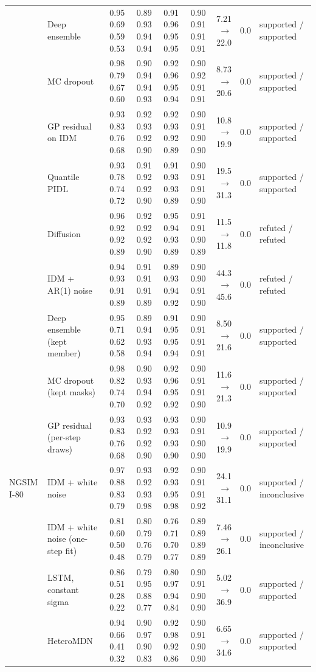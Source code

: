 \begin{longtable}{llrrrrrrl}
 & Deep ensemble & 0.95 0.69 0.59 0.53 & 0.89 0.93 0.94 0.94 & 0.91 0.96 0.95 0.95 & 0.90 0.91 0.91 0.91 & 7.21 $\rightarrow$ 22.0 & 0.0 & supported / supported \\
 & MC dropout & 0.98 0.79 0.67 0.60 & 0.90 0.94 0.94 0.93 & 0.92 0.96 0.95 0.94 & 0.90 0.92 0.91 0.91 & 8.73 $\rightarrow$ 20.6 & 0.0 & supported / supported \\
 & GP residual on IDM & 0.93 0.83 0.76 0.68 & 0.92 0.93 0.92 0.90 & 0.92 0.93 0.92 0.89 & 0.90 0.91 0.90 0.90 & 10.8 $\rightarrow$ 19.9 & 0.0 & supported / supported \\
 & Quantile PIDL & 0.93 0.78 0.74 0.72 & 0.91 0.92 0.92 0.90 & 0.91 0.93 0.93 0.89 & 0.90 0.91 0.91 0.90 & 19.5 $\rightarrow$ 31.3 & 0.0 & supported / supported \\
 & Diffusion & 0.96 0.92 0.92 0.89 & 0.92 0.92 0.92 0.90 & 0.95 0.94 0.93 0.89 & 0.91 0.91 0.90 0.89 & 11.5 $\rightarrow$ 11.8 & 0.0 & refuted / refuted \\
 & IDM + AR(1) noise & 0.94 0.93 0.91 0.89 & 0.91 0.91 0.91 0.89 & 0.89 0.93 0.94 0.92 & 0.90 0.90 0.91 0.90 & 44.3 $\rightarrow$ 45.6 & 0.0 & refuted / refuted \\
 & Deep ensemble (kept member) & 0.95 0.71 0.62 0.58 & 0.89 0.94 0.93 0.94 & 0.91 0.95 0.95 0.94 & 0.90 0.91 0.91 0.91 & 8.50 $\rightarrow$ 21.6 & 0.0 & supported / supported \\
 & MC dropout (kept masks) & 0.98 0.82 0.74 0.70 & 0.90 0.93 0.94 0.92 & 0.92 0.96 0.95 0.92 & 0.90 0.91 0.91 0.90 & 11.6 $\rightarrow$ 21.3 & 0.0 & supported / supported \\
 & GP residual (per-step draws) & 0.93 0.83 0.76 0.68 & 0.93 0.92 0.92 0.90 & 0.93 0.93 0.93 0.90 & 0.90 0.91 0.90 0.90 & 10.9 $\rightarrow$ 19.9 & 0.0 & supported / supported \\
\midrule
NGSIM I-80 & IDM + white noise & 0.97 0.88 0.83 0.79 & 0.93 0.92 0.93 0.98 & 0.92 0.93 0.95 0.98 & 0.90 0.91 0.91 0.92 & 24.1 $\rightarrow$ 31.1 & 0.0 & supported / inconclusive \\
 & IDM + white noise (one-step fit) & 0.81 0.60 0.50 0.48 & 0.80 0.79 0.76 0.79 & 0.76 0.71 0.70 0.77 & 0.89 0.89 0.89 0.89 & 7.46 $\rightarrow$ 26.1 & 0.0 & supported / inconclusive \\
 & LSTM, constant sigma & 0.86 0.51 0.28 0.22 & 0.79 0.95 0.88 0.77 & 0.80 0.97 0.94 0.84 & 0.90 0.91 0.90 0.90 & 5.02 $\rightarrow$ 36.9 & 0.0 & supported / supported \\
 & HeteroMDN & 0.94 0.66 0.41 0.32 & 0.90 0.97 0.90 0.83 & 0.92 0.98 0.92 0.86 & 0.90 0.91 0.90 0.90 & 6.65 $\rightarrow$ 34.6 & 0.0 & supported / supported \\

\end{longtable}

